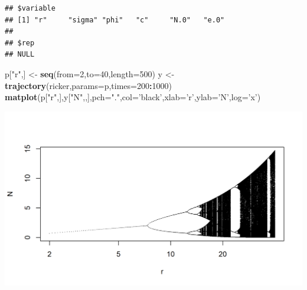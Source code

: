 \documentclass[]{article}
\newenvironment{Shaded}{\begin{snugshade}}{\end{snugshade}}
\newcommand{\KeywordTok}[1]{\textcolor[rgb]{0.13,0.29,0.53}{\textbf{#1}}}
\newcommand{\DataTypeTok}[1]{\textcolor[rgb]{0.13,0.29,0.53}{#1}}
\newcommand{\DecValTok}[1]{\textcolor[rgb]{0.00,0.00,0.81}{#1}}
\newcommand{\StringTok}[1]{\textcolor[rgb]{0.31,0.60,0.02}{#1}}
\newcommand{\OperatorTok}[1]{\textcolor[rgb]{0.81,0.36,0.00}{\textbf{#1}}}
\newcommand{\NormalTok}[1]{#1}
\begin{document}
\begin{verbatim}
## $variable
## [1] "r"     "sigma" "phi"   "c"     "N.0"   "e.0"  
## 
## $rep
## NULL
\end{verbatim}

\begin{Shaded}
\begin{Highlighting}[]
\NormalTok{p[}\StringTok{"r"}\NormalTok{,] <-}\StringTok{ }\KeywordTok{seq}\NormalTok{(}\DataTypeTok{from=}\DecValTok{2}\NormalTok{,}\DataTypeTok{to=}\DecValTok{40}\NormalTok{,}\DataTypeTok{length=}\DecValTok{500}\NormalTok{)}
\NormalTok{y <-}\StringTok{ }\KeywordTok{trajectory}\NormalTok{(ricker,}\DataTypeTok{params=}\NormalTok{p,}\DataTypeTok{times=}\DecValTok{200}\OperatorTok{:}\DecValTok{1000}\NormalTok{)}
\KeywordTok{matplot}\NormalTok{(p[}\StringTok{"r"}\NormalTok{,],y[}\StringTok{"N"}\NormalTok{,,],}\DataTypeTok{pch=}\StringTok{"."}\NormalTok{,}\DataTypeTok{col=}\StringTok{'black'}\NormalTok{,}\DataTypeTok{xlab=}\StringTok{'r'}\NormalTok{,}\DataTypeTok{ylab=}\StringTok{'N'}\NormalTok{,}\DataTypeTok{log=}\StringTok{'x'}\NormalTok{)}
\end{Highlighting}
\end{Shaded}

\begin{center}\includegraphics{figure/intro-bifdiag-1} \end{center}
\end{document}
